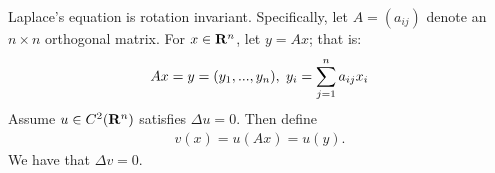 \begin{proposition}
	Laplace's equation is rotation invariant. Specifically, let $A = (a_{ij})$ denote an $n \times n$ orthogonal matrix. For $x \in \bfR^n$, let $y = Ax$; that is:
        \begin{equation*}
        \begin{split}
            Ax = y = (y_1,...,y_n), \h3 y_i = \sum_{j = 1}^n a_{ij}x_i
        \end{split}
        \end{equation*}
    Assume $u \in C^2(\bfR^n)$ satisfies $\Delta u = 0$. Then define
        \begin{equation*}
        \begin{split}
            v(x) = u(Ax) = u(y).
        \end{split}
        \end{equation*}
    We have that $\Delta v = 0$.
\end{proposition}
